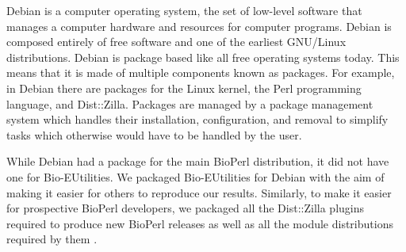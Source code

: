 Debian is a computer operating system, the set of low-level software
that manages a computer hardware and resources for computer programs.
Debian is
composed entirely of free software and one of the earliest GNU/Linux
distributions.
Debian is package based like all free operating systems today.
This means that it is made of multiple components known as
packages.  For example, in Debian there are packages for the Linux
kernel, the Perl programming language, and Dist::Zilla.  Packages are
managed by a package management system which handles their
installation, configuration, and removal to simplify tasks which otherwise would
have to be handled by the user.

While Debian had a package for the main BioPerl distribution, it did
not have one for Bio-EUtilities.  We packaged Bio-EUtilities for
Debian with the aim of making it easier for
others to reproduce our results.
Similarly, to make it easier for prospective BioPerl
developers, we packaged all the Dist::Zilla plugins required to produce
new BioPerl releases as well
as all the module distributions required by them
.


